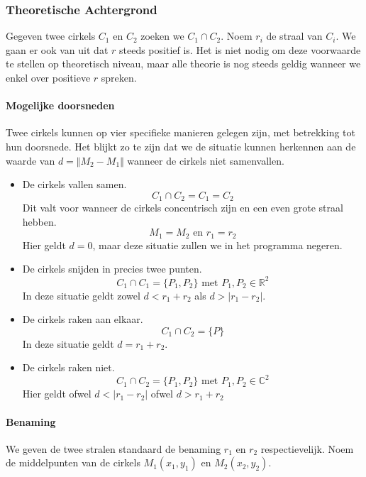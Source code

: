 \subsubsection{Theoretische Achtergrond}
\begin{figure}[H]

\end{figure}
Gegeven twee cirkels $C_1$ en $C_2$ zoeken we $C_1 \cap C_2$. Noem $r_i$ de straal van $C_i$. We gaan er ook van uit dat $r$ steeds positief is. Het is niet nodig om deze voorwaarde te stellen op theoretisch niveau, maar alle theorie is nog steeds geldig wanneer we enkel over positieve $r$ spreken.
\paragraph{Mogelijke doorsneden}
Twee cirkels kunnen op vier specifieke manieren gelegen zijn, met betrekking tot hun doorsnede. Het blijkt zo te zijn dat we de situatie kunnen herkennen aan de waarde van $d=\Vert M_2-M_1\Vert$ wanneer de cirkels niet samenvallen.
\begin{itemize}
\item De cirkels vallen samen.\\
\[C_1 \cap C_2 = C_1 = C_2\]
Dit valt voor wanneer de cirkels concentrisch zijn en een even grote straal hebben.
\[
M_1 = M_2 \text{ en } r_1 = r_2
\]
Hier geldt $d = 0$, maar deze situatie zullen we in het programma negeren.

\item De cirkels snijden in precies twee punten.\\
\[C_1 \cap C_1 = \{P_1,P_2\} \text{ met } P_1,P_2 \in \mathbb{R}^2\]
In deze situatie geldt zowel $d < r_1+r_2$ als $ d > |r_1-r_2|$.

\item De cirkels raken aan elkaar.\\
\[C_1 \cap C_2 = \{P\}\]
In deze situatie geldt $d = r_1+r_2$.

\item De cirkels raken niet.
\[C_1 \cap C_2 = \{P_1,P_2\} \text{ met } P_1,P_2 \in \mathbb{C}^2\]
Hier geldt ofwel $d < |r_1-r_2|$ ofwel $d > r_1+r_2$
\end{itemize}

\paragraph{Benaming}
We geven de twee stralen standaard de benaming $r_1$ en $r_2$ respectievelijk.
Noem de middelpunten van de cirkels $M_1(x_1,y_1)$ en $M_2(x_2,y_2)$. 

